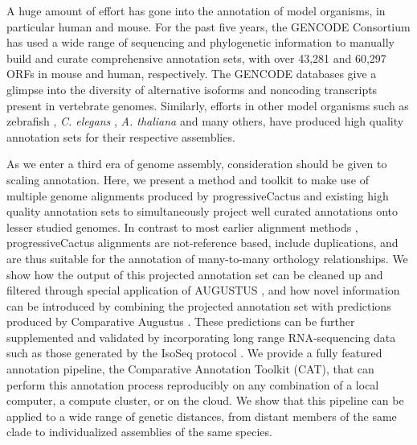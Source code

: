 \documentclass[fleqn,10pt]{wlscirep}
\begin{document}
A huge amount of effort has gone into the annotation of model organisms, in particular human and mouse. For the past five years, the GENCODE Consortium \cite{harrow2012gencode} has used a wide range of sequencing and phylogenetic information to manually build and curate comprehensive annotation sets, with over 43,281 and 60,297 ORFs in mouse and human, respectively. The GENCODE databases give a glimpse into the diversity of alternative isoforms and noncoding transcripts present in vertebrate genomes. Similarly, efforts in other model organisms such as zebrafish \cite{westerfield1998zebrafish}, \textit{C. elegans} \cite{stein2001wormbase}, \textit{A. thaliana} \cite{swarbreck2008arabidopsis} and many others, have produced high quality annotation sets for their respective assemblies.

As we enter a third era of genome assembly, consideration should be given to scaling annotation. 
Here, we present a method and toolkit to make use of multiple genome alignments produced by progressiveCactus \cite{paten2011cactus} and existing high quality annotation sets 
 to simultaneously project well curated annotations onto lesser studied genomes. 
In contrast to most earlier alignment methods \cite{blanchette2004aligning,earl2014alignathon,miller200728}, progressiveCactus alignments are not-reference based, include duplications, and are thus suitable for the annotation of many-to-many orthology relationships. We show how the output of this projected annotation set can be cleaned up and filtered through special application of AUGUSTUS \cite{stanke2008using}, and how novel information can be introduced by combining the projected annotation set with predictions produced by Comparative Augustus \cite{konig2015simultaneous}. These predictions can be further supplemented and validated by incorporating long range RNA-sequencing data such as those generated by the IsoSeq protocol \cite{gordon2015widespread}. We provide a fully featured annotation pipeline, the Comparative Annotation Toolkit (CAT), that can perform this annotation process reproducibly on any combination of a local computer, a compute cluster, or on the cloud. We show that this pipeline can be applied to a wide range of genetic distances, from distant members of the same clade to individualized assemblies of the same species.
\end{document}
